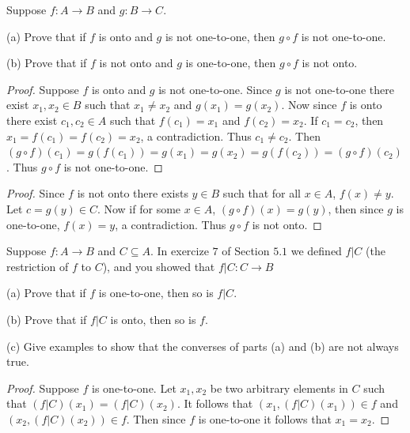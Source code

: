 \begin{tcolorbox}[title=Problem 11, breakable]
    Suppose $f : A \rightarrow B$ and $g : B \rightarrow C$.

    (a) Prove that if $f$ is onto and $g$ is not one-to-one,
        then $g \circ f$ is not one-to-one.

    (b) Prove that if $f$ is not onto and $g$ is one-to-one, 
        then $g \circ f$ is not onto.
\end{tcolorbox}

\begin{proof}
    Suppose $f$ is onto and $g$ is not one-to-one.
    Since $g$ is not one-to-one there exist 
        $x_1, x_2 \in B$ such that $x_1 \ne x_2$ and $g(x_1) = g(x_2)$.
    Now since $f$ is onto there exist $c_1, c_2 \in A$
        such that $f(c_1) = x_1$ and $f(c_2) = x_2$.
    If $c_1 = c_2$, then $x_1 = f(c_1) = f(c_2) = x_2$, a contradiction.
    Thus $c_1 \ne c_2$.
    Then $(g \circ f)(c_1) = g(f(c_1)) = g(x_1) = g(x_2) = g(f(c_2)) = (g \circ f)(c_2)$.
    Thus $g \circ f$ is not one-to-one.
\end{proof}

\begin{proof}
    Since $f$ is not onto there exists $y \in B$
        such that for all $x \in A$, $f(x) \ne y$.
    Let $c = g(y) \in C$.
    Now if for some $x \in A$, $(g \circ f)(x) = g(y)$,
        then since $g$ is one-to-one, $f(x) = y$, a contradiction.
    Thus $g \circ f$ is not onto.
\end{proof}


\begin{tcolorbox}[title=Problem 13, breakable]
    Suppose $f : A \rightarrow B$ and $C \subseteq A$.
    In exercize $7$ of Section $5.1$ we defined 
        $f | C$ (the restriction of $f$ to $C$),
        and you showed that $f | C : C \rightarrow B$

    (a) Prove that if $f$ is one-to-one, then so is $f | C$.

    (b) Prove that if $f | C$ is onto, then so is $f$.

    (c) Give examples to show that the converses of parts (a)
        and (b) are not always true.
\end{tcolorbox}

\begin{proof}
    Suppose $f$ is one-to-one.
    Let $x_1, x_2$ be two arbitrary elements in $C$ such that $(f | C)(x_1) = (f | C)(x_2)$.
    It follows that $(x_1, (f | C)(x_1)) \in f$ and $(x_2, (f | C)(x_2)) \in f$.
    Then since $f$ is one-to-one it follows that $x_1 = x_2$.
\end{proof}

